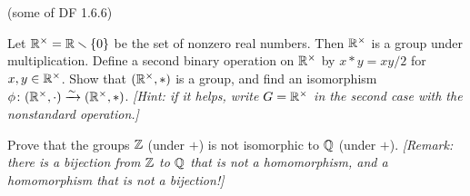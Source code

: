 \begin{problem}{\textsf{(some of DF 1.6.6)}}
  \begin{enumalph}
  \item Let $\mathbb{R}^\times = \mathbb{R} \smallsetminus \{0\}$ be the set of nonzero real numbers.
  Then $\mathbb{R}^\times$ is a group under multiplication.  Define a second binary operation
  on $\mathbb{R}^\times$ by $x*y=xy/2$ for $x,y \in \mathbb{R}^\times$.  Show that $(\mathbb{R}^\times,*)$ is
  a group, and find an isomorphism $\phi \colon (\mathbb{R}^\times,\cdot) \xrightarrow{\sim} 
  (\mathbb{R}^\times,*)$.  \emph{[Hint: if it helps, write $G=\mathbb{R}^\times$ in the second case 
  with the nonstandard operation.]}
  \item Prove that the groups $\mathbb{Z}$ (under $+$) is not isomorphic to $\mathbb{Q}$ (under $+$).
  \emph{[Remark: there is a bijection from $\mathbb{Z}$ to $\mathbb{Q}$ that is not a homomorphism, 
  and a homomorphism that is not a bijection!]}
  \end{enumalph}
\end{problem}

\begin{Answer}
  
\end{Answer}
